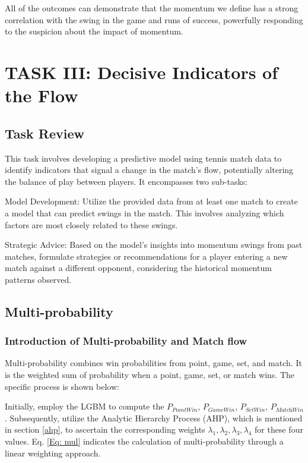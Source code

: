 \documentclass{mcmthesis}
\begin{document}
All of the outcomes can demonstrate that the momentum we define has a strong correlation with the swing in the game and runs of success, powerfully responding to the suspicion about the impact of momentum.

\section{TASK III: Decisive Indicators of the Flow}
\subsection{Task Review}
This task involves developing a predictive model using tennis match data to identify indicators that signal a change in the match's flow, potentially altering the balance of play between players. It encompasses two sub-tasks:

Model Development: Utilize the provided data from at least one match to create a model that can predict swings in the match. This involves analyzing which factors are most closely related to these swings.

Strategic Advice: Based on the model's insights into momentum swings from past matches, formulate strategies or recommendations for a player entering a new match against a different opponent, considering the historical momentum patterns observed.

\subsection{Multi-probability}\label{multi-probability}
\subsubsection{Introduction of Multi-probability and Match flow}
Multi-probability combines win probabilities from point, game, set, and match. It is the weighted sum of probability when a point, game, set, or match wins. The specific process is shown below: 

Initially, employ the LGBM to compute the $P_\textit{PointWin}$, $P_\textit{GameWin}$, $P_\textit{SetWin}$, $P_\textit{MatchWin}$. Subsequently, utilize the  Analytic Hierarchy Process (AHP), which is mentioned in section \ref{ahp}, to ascertain the corresponding weights $\lambda_1, \lambda_2, \lambda_3, \lambda_4$ for these four values. Eq. \ref{Eq: mul} indicates the calculation of multi-probability through a linear weighting approach.
\end{document}
